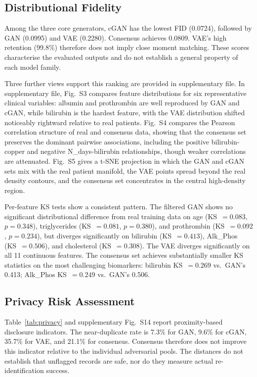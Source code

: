 \documentclass[journal]{IEEEtran}
\begin{document}
\subsection{Distributional Fidelity}

Among the three core generators, cGAN has the lowest FID (0.0724), followed by GAN (0.0995) and VAE (0.2280). Consensus achieves 0.0809. VAE's high retention (99.8\%) therefore does not imply close moment matching. These scores characterise the evaluated outputs and do not establish a general property of each model family.

Three further views support this ranking are provided in supplementary file. In supplementary file, Fig.~S3 compares feature distributions for six representative clinical variables: albumin and prothrombin are well reproduced by GAN and cGAN, while bilirubin is the hardest feature, with the VAE distribution shifted noticeably rightward relative to real patients. Fig.~S4 compares the Pearson correlation structure of real and consensus data, showing that the consensus set preserves the dominant pairwise associations, including the positive bilirubin-copper and negative N\_days-bilirubin relationships, though weaker correlations are attenuated. Fig.~S5 gives a t-SNE projection in which the GAN and cGAN sets mix with the real patient manifold, the VAE points spread beyond the real density contours, and the consensus set concentrates in the central high-density region.

Per-feature KS tests show a consistent pattern. The filtered GAN shows no significant distributional difference from real training data on age (KS~$= 0.083$, $p = 0.348$), triglycerides (KS~$= 0.081$, $p = 0.380$), and prothrombin (KS~$= 0.092$, $p = 0.234$), but diverges significantly on bilirubin (KS~$= 0.413$), Alk\_Phos (KS~$= 0.506$), and cholesterol (KS~$= 0.308$). The VAE diverges significantly on all 11 continuous features. The consensus set achieves substantially smaller KS statistics on the most challenging biomarkers: bilirubin KS~$= 0.269$ vs.\ GAN's 0.413; Alk\_Phos KS~$= 0.249$ vs.\ GAN's 0.506.

\subsection{Privacy Risk Assessment}

Table~\ref{tab:privacy} and supplementary Fig.~S14 report proximity-based disclosure indicators. The near-duplicate rate is 7.3\% for GAN, 9.6\% for cGAN, 35.7\% for VAE, and 21.1\% for consensus. Consensus therefore does not improve this indicator relative to the individual adversarial pools. The distances do not establish that unflagged records are safe, nor do they measure actual re-identification success.
\end{document}
